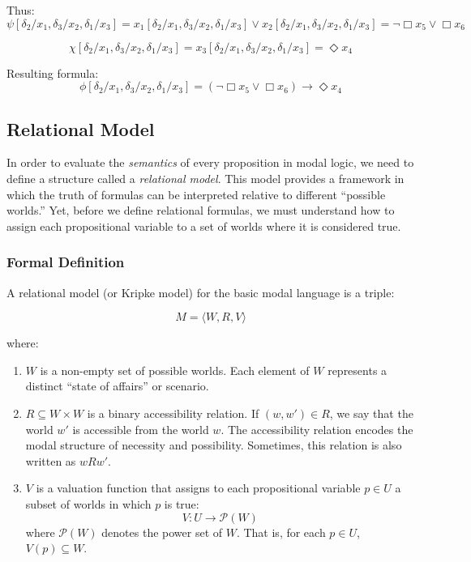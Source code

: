 \documentclass[12pt,a4paper,openany]{article}
\begin{document}
Thus:
$$\psi[\delta_2/x_1, \delta_3/x_2, \delta_1/x_3] = x_1[\delta_2/x_1, \delta_3/x_2, \delta_1/x_3] \lor x_2[\delta_2/x_1, \delta_3/x_2, \delta_1/x_3] = \neg \Box x_5 \lor \Box x_6$$

$$\chi[\delta_2/x_1, \delta_3/x_2, \delta_1/x_3] = x_3[\delta_2/x_1, \delta_3/x_2, \delta_1/x_3] = \Diamond x_4$$

Resulting formula:
$$\phi[\delta_2/x_1, \delta_3/x_2, \delta_1/x_3] = (\neg \Box x_5 \lor \Box x_6) \to \Diamond x_4$$

\subsection{Relational Model}

In order to evaluate the \textit{semantics} of every proposition in modal logic, we need to define a structure called a \textit{relational model}. This model provides a framework in which the truth of formulas can be interpreted relative to different ``possible worlds.'' Yet, before we define relational formulas, we must understand how to assign each propositional variable to a set of worlds where it is considered true.

\subsubsection{Formal Definition}

A relational model (or Kripke model) for the basic modal language is a triple:

$$M = \langle W, R, V \rangle$$

where:

\begin{enumerate}
    \item $W$ is a non-empty set of possible worlds. Each element of $W$ represents a distinct ``state of affairs'' or scenario.
    
    \item $R \subseteq W \times W$ is a binary accessibility relation. If $(w, w') \in R$, we say that the world $w'$ is accessible from the world $w$. The accessibility relation encodes the modal structure of necessity and possibility. Sometimes, this relation is also written as $w R w'$.
    
    \item $V$ is a valuation function that assigns to each propositional variable $p \in U$ a subset of worlds in which $p$ is true:
    $$V : U \to \mathcal{P}(W)$$
    where $\mathcal{P}(W)$ denotes the power set of $W$. That is, for each $p \in U$, $V(p) \subseteq W$.
\end{enumerate}
\end{document}
